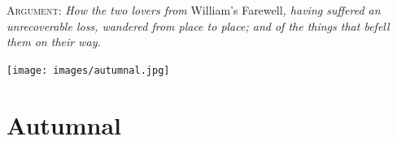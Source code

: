 \documentclass{amsbook}
\begin{document}
\thispagestyle{empty}
\vspace*{\fill}
\noindent \textsc{Argument:} \textit{How the two lovers from} William's Farewell\textit{, having suffered an unrecoverable loss, wandered from place to place; and of the things that befell them on their way.}
\vspace*{\fill}
\clearpage

\thispagestyle{empty}
\vspace*{\fill}
{\centering
\texttt{[image: images/autumnal.jpg]}}
\vspace*{\fill}
\clearpage

\mainmatter

\chapter{Autumnal}
\end{document}
